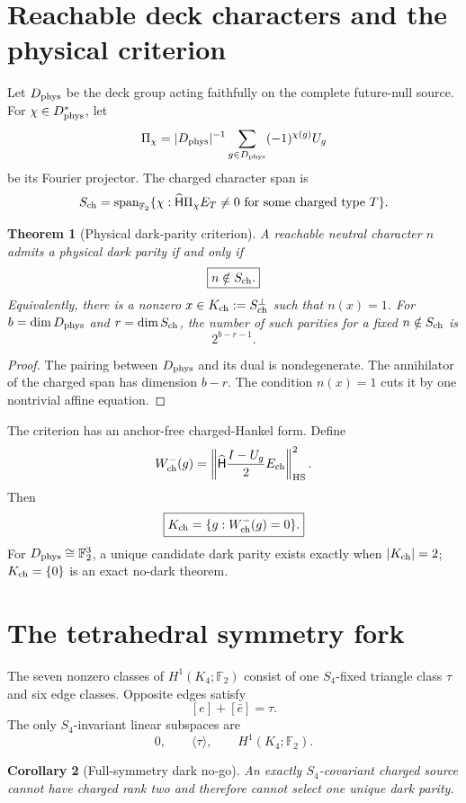 \documentclass[11pt,oneside,openany]{book}
\numberwithin{equation}{chapter}
\newtheorem{theorem}{Theorem}[chapter]
\newtheorem{corollary}[theorem]{Corollary}
\theoremstyle{definition}
\theoremstyle{remark}
\newcommand{\Span}{\operatorname{span}}
\newcommand{\Ftwo}{\mathbb F_2}
\begin{document}
\section{Reachable deck characters and the physical criterion}
Let \(D_{\rm phys}\) be the deck group acting faithfully on the complete
future-null source.  For \(\chi\in D_{\rm phys}^*\), let
\[
 \Pi_\chi
 =|D_{\rm phys}|^{-1}\sum_{g\in D_{\rm phys}}
 (-1)^{\chi(g)}U_g
\]
be its Fourier projector.  The charged character span is
\[
 S_{\rm ch}
 =\Span_{\Ftwo}\{\chi:\widehat{\mathsf H}\Pi_\chi E_T\ne0
 \text{ for some charged type }T\}.
\]

\begin{theorem}[Physical dark-parity criterion]
\label{thm:v5-physical-dark-criterion}
A reachable neutral character \(n\) admits a physical dark parity if and only
if
\[
 \boxed{n\notin S_{\rm ch}.}
\]
Equivalently, there is a nonzero
\(x\in K_{\rm ch}:=S_{\rm ch}^{\perp}\) such that \(n(x)=1\).
For \(b=\dim D_{\rm phys}\) and \(r=\dim S_{\rm ch}\), the number of such
parities for a fixed \(n\notin S_{\rm ch}\) is
\[
 \boxed{2^{b-r-1}.}
\]
\end{theorem}

\begin{proof}
The pairing between \(D_{\rm phys}\) and its dual is nondegenerate.  The
annihilator of the charged span has dimension \(b-r\).  The condition
\(n(x)=1\) cuts it by one nontrivial affine equation.
\end{proof}

The criterion has an anchor-free charged-Hankel form.  Define
\[
 W_{\rm ch}^-(g)
 =\left\|\widehat{\mathsf H}\frac{I-U_g}{2}E_{\rm ch}\right\|_{\rm HS}^2.
\]
Then
\[
 \boxed{K_{\rm ch}=\{g:W_{\rm ch}^-(g)=0\}.}
\]
For \(D_{\rm phys}\cong\Ftwo^3\), a unique candidate dark parity exists
exactly when \(|K_{\rm ch}|=2\); \(K_{\rm ch}=\{0\}\) is an exact no-dark
theorem.

\section{The tetrahedral symmetry fork}
The seven nonzero classes of \(H^1(K_4;\Ftwo)\) consist of one
\(S_4\)-fixed triangle class \(\tau\) and six edge classes.  Opposite edges
satisfy
\[
 [e]+[\bar e]=\tau.
\]
The only \(S_4\)-invariant linear subspaces are
\[
 0,\qquad\langle\tau\rangle,\qquad H^1(K_4;\Ftwo).
\]

\begin{corollary}[Full-symmetry dark no-go]
\label{cor:v5-s4-dark-nogo}
An exactly \(S_4\)-covariant charged source cannot have charged rank two and
therefore cannot select one unique dark parity.
\end{corollary}
\end{document}
